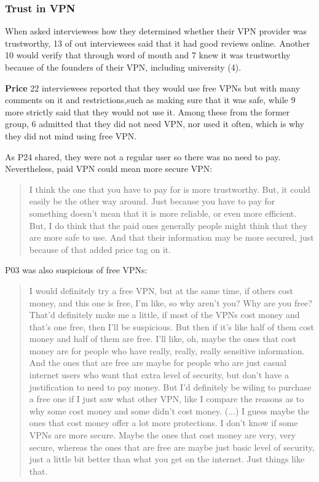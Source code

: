 \subsubsection{Trust in VPN}
When asked interviewees how they determined whether their VPN provider was trustworthy, 13 of out interviewees said that it had good reviews online. Another 10 would verify that through word of mouth and 7 knew it was trustworthy because of the founders of their VPN, including university (4). 

\textbf{Price}
22 interviewees reported that they would use free VPNs but with many comments on it and restrictions,such as making sure that it was safe, while 9 more strictly said that they would not use it. Among these from the former group, 6 admitted that they did not need VPN, nor used it often, which is why they did not mind using free VPN. 

As P24 shared, they were not a regular user so there was no need to pay. Nevertheless, paid VPN could mean more secure VPN:
\begin{quote} I think the one that you have to pay for is more trustworthy. But, it could easily be the other way around. Just because you have to pay for something doesn't mean that it is more reliable, or even more efficient. But, I do think that the paid ones generally people might think that they are more safe to use. And that their information may be more secured, just because of that added price tag on it.\end{quote}

P03 was also suspicious of free VPNs:
\begin{quote}I would definitely try a free VPN, but at the same time, if others cost money, and this one is free, I'm like, so why aren't you? Why are you free? That'd definitely make me a little, if most of the VPNs cost money and that's one free, then I'll be suspicious. But then if it's like half of them cost money and half of them are free. I'll like, oh, maybe the ones that cost money are for people who have really, really, really sensitive information. And the ones that are free are maybe for people who are just casual internet users who want that extra level of security, but don't have a justification to need to pay money. But I'd definitely be wiling to purchase a free one if I just saw what other VPN, like I compare the reasons as to why some cost money and some didn't cost money. (...) I guess maybe the ones that cost money offer a lot more protections. I don't know if some VPNs are more secure. Maybe the ones that cost money are very, very secure, whereas the ones that are free are maybe just basic level of security, just a little bit better than what you get on the internet. Just things like that.\end{quote}


